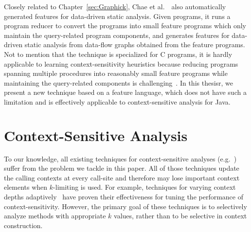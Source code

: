 Closely related to Chapter~\ref{sec:Graphick}, Chae et al.~\cite{ChOhHeYa17}~also automatically generated features for data-driven static analysis.
Given programs, it runs a program reducer to convert the programs into small feature programs which only maintain the query-related program components,
and generates features for data-driven static analysis from data-flow graphs obtained from the feature programs.
Not to mention that the technique is specialized for C programs, it is hardly applicable to learning context-sensitivity heuristics because reducing programs spanning multiple procedures into reasonably small feature programs while maintaining the query-related components is challenging~\cite{ChOhHeYa17}. In this thesisr, we present a new technique based on a feature language, which does not have such a limitation and is effectively applicable to context-sensitive analysis for Java.




\section{Context-Sensitive Analysis} To our knowledge, all
existing techniques for context-sensitive analyses
(e.g.~\cite{Sharir1981,Milanova2002,Shivers1988,
  Whaley2004,Milanova2005,Smaragdakis2011, Khedker2008,
  Karkare2007,kastrinis2013hybrid,WeiR15,Smaragdakis2014,JeJeChOh17,Oh2014,TanLX16,PadhyeK13})
suffer from the problem we tackle in this paper. All of those
techniques update the calling contexts at every call-site and
therefore may lose important context elements when $k$-limiting is used.  For example,
techniques for varying context depths
adaptively~\cite{WeiR15,JeJeChOh17,Oh2014, Smaragdakis2014} have proven
their effectiveness for tuning the performance of context-sensitivity.  However,
the primary goal of these techniques is to selectively analyze methods
with appropriate $k$ values, rather than to be selective in context
construction.


